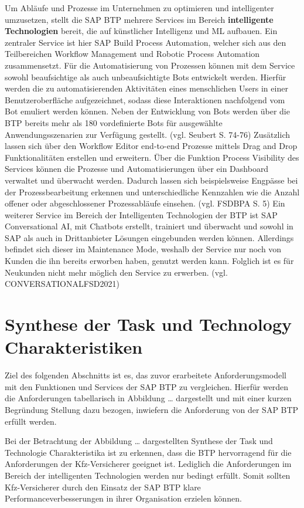 Um Abläufe und Prozesse im Unternehmen zu optimieren und intelligenter umzusetzen, stellt die SAP BTP mehrere Services im Bereich \textbf{intelligente Technologien} bereit, die auf künstlicher Intelligenz und ML aufbauen.  Ein zentraler Service ist hier SAP Build Process Automation, welcher sich aus den Teilbereichen Workflow Management und Robotic Process Automation zusammensetzt. Für die Automatisierung von Prozessen können mit dem Service sowohl beaufsichtige als auch unbeaufsichtigte Bots entwickelt werden. Hierfür werden die zu automatisierenden Aktivitäten eines menschlichen Users in einer Benutzeroberfläche aufgezeichnet, sodass diese Interaktionen nachfolgend vom Bot emuliert werden können. Neben der Entwicklung von Bots werden über die BTP bereits mehr als 180 vordefinierte Bots für ausgewählte Anwendungsszenarien zur Verfügung gestellt. (vgl. Seubert S. 74-76) Zusätzlich lassen sich über den Workflow Editor end-to-end Prozesse mittels Drag and Drop Funktionalitäten erstellen und erweitern. Über die Funktion Process Visibility des Services können die Prozesse und Automatisierungen über ein Dashboard verwaltet und überwacht werden. Dadurch lassen sich beispielsweise Engpässe bei der Prozessbearbeitung erkennen und unterschiedliche Kennzahlen wie die Anzahl offener oder abgeschlossener Prozessabläufe einsehen. (vgl. FSDBPA S. 5)
Ein weiterer Service im Bereich der Intelligenten Technologien der BTP ist SAP Conversational AI, mit Chatbots erstellt, trainiert und überwacht und sowohl in SAP als auch in Drittanbieter Lösungen eingebunden werden können. Allerdings befindet sich dieser im Maintenance Mode, weshalb der Service nur noch von Kunden die ihn bereits erworben haben, genutzt werden kann. Folglich ist es für Neukunden nicht mehr möglich den Service zu erwerben. (vgl. CONVERSATIONALFSD2021)









\section{Synthese der Task und Technology Charakteristiken}

Ziel des folgenden Abschnitts ist es, das zuvor erarbeitete Anforderungsmodell mit den Funktionen und Services der SAP BTP zu vergleichen. Hierfür werden die Anforderungen tabellarisch in Abbildung … dargestellt und mit einer kurzen Begründung Stellung dazu bezogen, inwiefern die Anforderung von der SAP BTP erfüllt werden.
\newpage

Bei der Betrachtung der Abbildung … dargestellten Synthese der Task und Technologie Charakteristika ist zu erkennen, dass die BTP hervorragend für die Anforderungen der Kfz-Versicherer geeignet ist. Lediglich die Anforderungen im Bereich der intelligenten Technologien werden nur bedingt erfüllt. Somit sollten Kfz-Versicherer durch den Einsatz der SAP BTP klare Performanceverbesserungen in ihrer Organisation erzielen können.


\newpage